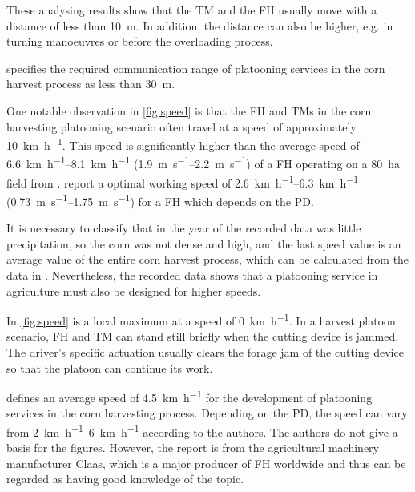 These analysing results show that the \ac{TM} and the \ac{FH} usually move with a distance of less than \SI{10}{\metre}.
In addition, the distance can also be higher, e.g. in turning manoeuvres or before the overloading process.

\textcite{smolnik_5g_2020} specifies the required communication range of platooning services in the corn harvest process
as less than \SI{30}{\metre}.

One notable observation in \autoref{fig:speed} is that the \ac{FH} and \ac{TM}s in the corn harvesting platooning scenario
often travel at a speed of approximately \SI{10}{\kilo\metre\per\hour}.
This speed is significantly higher than the average speed of \SIrange{6.6}{8.1}{\kilo\metre\per\hour} (\SIrange{1.9}{2.2}{\metre\per\second}) of a \ac{FH} operating on a \SI{80}{\hectare} field from \cite{faustzahlen2018}.
\textcite{nedelcu_influence_2020} report a optimal working speed of \SIrange{2.6}{6.3}{\kilo\metre\per\hour} (\SIrange{0.73}{1.75}{\metre\per\second}) for a \ac{FH} which depends on the \ac{PD}.


It is necessary to classify that in the year of the recorded data was little precipitation, so the corn was not dense and high,
and the last speed value is an average value of the entire corn harvest process,
which can be calculated from the data in \cite{faustzahlen2018}.
Nevertheless, the recorded data shows that a platooning service in agriculture must also be designed for higher speeds.

In \autoref{fig:speed} is a local maximum at a speed of \SI{0}{\kilo\metre\per\hour}.
In a harvest platoon scenario, \ac{FH} and \ac{TM} can stand still briefly when the cutting device is jammed.
The driver's specific actuation usually clears the forage jam of the cutting device so that the platoon can continue its work.

\textcite{smolnik_5g_2020} defines an average speed of \SI{4.5}{\kilo\metre\per\hour} for the development of platooning
services in the corn harvesting process.
Depending on the \ac{PD}, the speed can vary from \SIrange{2}{6}{\kilo\metre\per\hour} according to the authors.
The authors do not give a basis for the figures.
However, the report is from the agricultural machinery manufacturer Claas,
which is a major producer of \ac{FH} worldwide and thus can be regarded as having good knowledge of the topic.

